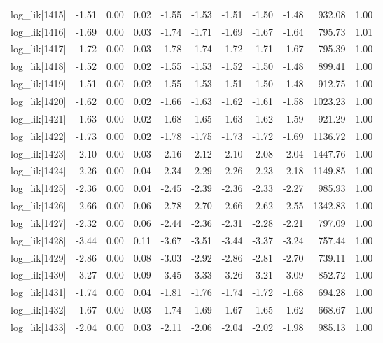 \begin{table}[ht]
\begin{tabular}{rrrrrrrrrrr}
  log\_lik[1415] & -1.51 & 0.00 & 0.02 & -1.55 & -1.53 & -1.51 & -1.50 & -1.48 & 932.08 & 1.00 \\ 
  log\_lik[1416] & -1.69 & 0.00 & 0.03 & -1.74 & -1.71 & -1.69 & -1.67 & -1.64 & 795.73 & 1.01 \\ 
  log\_lik[1417] & -1.72 & 0.00 & 0.03 & -1.78 & -1.74 & -1.72 & -1.71 & -1.67 & 795.39 & 1.00 \\ 
  log\_lik[1418] & -1.52 & 0.00 & 0.02 & -1.55 & -1.53 & -1.52 & -1.50 & -1.48 & 899.41 & 1.00 \\ 
  log\_lik[1419] & -1.51 & 0.00 & 0.02 & -1.55 & -1.53 & -1.51 & -1.50 & -1.48 & 912.75 & 1.00 \\ 
  log\_lik[1420] & -1.62 & 0.00 & 0.02 & -1.66 & -1.63 & -1.62 & -1.61 & -1.58 & 1023.23 & 1.00 \\ 
  log\_lik[1421] & -1.63 & 0.00 & 0.02 & -1.68 & -1.65 & -1.63 & -1.62 & -1.59 & 921.29 & 1.00 \\ 
  log\_lik[1422] & -1.73 & 0.00 & 0.02 & -1.78 & -1.75 & -1.73 & -1.72 & -1.69 & 1136.72 & 1.00 \\ 
  log\_lik[1423] & -2.10 & 0.00 & 0.03 & -2.16 & -2.12 & -2.10 & -2.08 & -2.04 & 1447.76 & 1.00 \\ 
  log\_lik[1424] & -2.26 & 0.00 & 0.04 & -2.34 & -2.29 & -2.26 & -2.23 & -2.18 & 1149.85 & 1.00 \\ 
  log\_lik[1425] & -2.36 & 0.00 & 0.04 & -2.45 & -2.39 & -2.36 & -2.33 & -2.27 & 985.93 & 1.00 \\ 
  log\_lik[1426] & -2.66 & 0.00 & 0.06 & -2.78 & -2.70 & -2.66 & -2.62 & -2.55 & 1342.83 & 1.00 \\ 
  log\_lik[1427] & -2.32 & 0.00 & 0.06 & -2.44 & -2.36 & -2.31 & -2.28 & -2.21 & 797.09 & 1.00 \\ 
  log\_lik[1428] & -3.44 & 0.00 & 0.11 & -3.67 & -3.51 & -3.44 & -3.37 & -3.24 & 757.44 & 1.00 \\ 
  log\_lik[1429] & -2.86 & 0.00 & 0.08 & -3.03 & -2.92 & -2.86 & -2.81 & -2.70 & 739.11 & 1.00 \\ 
  log\_lik[1430] & -3.27 & 0.00 & 0.09 & -3.45 & -3.33 & -3.26 & -3.21 & -3.09 & 852.72 & 1.00 \\ 
  log\_lik[1431] & -1.74 & 0.00 & 0.04 & -1.81 & -1.76 & -1.74 & -1.72 & -1.68 & 694.28 & 1.00 \\ 
  log\_lik[1432] & -1.67 & 0.00 & 0.03 & -1.74 & -1.69 & -1.67 & -1.65 & -1.62 & 668.67 & 1.00 \\ 
  log\_lik[1433] & -2.04 & 0.00 & 0.03 & -2.11 & -2.06 & -2.04 & -2.02 & -1.98 & 985.13 & 1.00 \\ 

\end{tabular}
\end{table}
